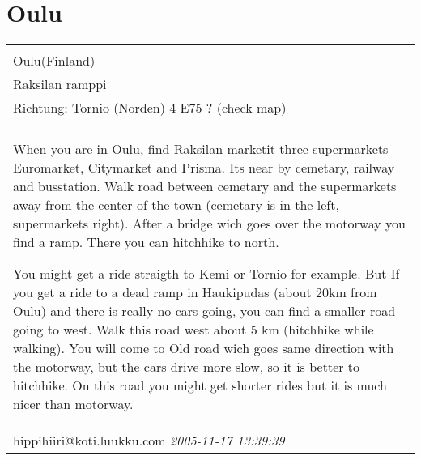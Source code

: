 \documentclass[a4paper,12pt]{article}
\begin{document}
\section{Oulu}
\begin{tabular}{|p{13cm}|}
\hline\\
Oulu(Finland)\\
Raksilan ramppi\\
Richtung: Tornio (Norden) 4 E75 ? (check map) \\
\hline\\
When you are in Oulu, find Raksilan marketit three supermarkets Euromarket, Citymarket and Prisma. Its near by cemetary, railway and busstation. Walk road between cemetary and the supermarkets away from the center of the town (cemetary is in the left, supermarkets right). After a bridge wich goes over the motorway you find a ramp. There you can hitchhike to north.

You might get a ride straigth to Kemi or Tornio for example. But If you get a ride to a dead ramp in Haukipudas (about 20km from Oulu) and there is really no cars going, you can find a smaller road going to west. Walk this road west about 5 km (hitchhike while walking). You will come to Old road wich goes same direction with the motorway, but the cars drive more slow, so it is better to hitchhike. On this road you might get shorter rides but it is much nicer than motorway. \\
hippihiiri@koti.luukku.com \textit{ 2005-11-17 13:39:39 }\\\hline
\end{tabular}
\end{document}
